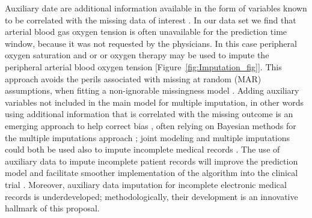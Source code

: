 \documentclass[11pt,notitlepage]{article}
\begin{document}
Auxiliary date are additional information available in the form of variables known to be correlated with the missing data of interest \cite{Daniels24571539}. In our data set we find that arterial blood gas oxygen tension is often unavailable for the prediction time window, because it was not requested by the physicians. In this case peripheral oxygen saturation and or or oxygen therapy may be used to impute the peripheral arterial blood oxygen tension [Figure~\ref{fig:Imputation_fig}]. This approach avoids the perils associated with missing at random (MAR) assumptions, when fitting a non-ignorable missingness model \cite{Wang_20029935}. Adding auxiliary variables not included in the main model for multiple imputation, in other words using additional information that is correlated with the missing outcome is an emerging approach to help correct bias \cite{Meng_1994, Collins_11778676, Rubin_1996}, often relying on Bayesian methods for the multiple imputations approach \cite{Daniels_2008, Schafer_1997}; joint modeling and multiple imputations could both be used also to impute incomplete medical records \cite{Fitzmaurice_2008}. The use of auxiliary data to impute incomplete patient records will improve the prediction model and facilitate smoother implementation of the algorithm into the clinical trial \cite{Hall_25389642}. Moreover, auxiliary data imputation for incomplete electronic medical records is underdeveloped; methodologically, their development is an innovative hallmark of this proposal.
\end{document}
